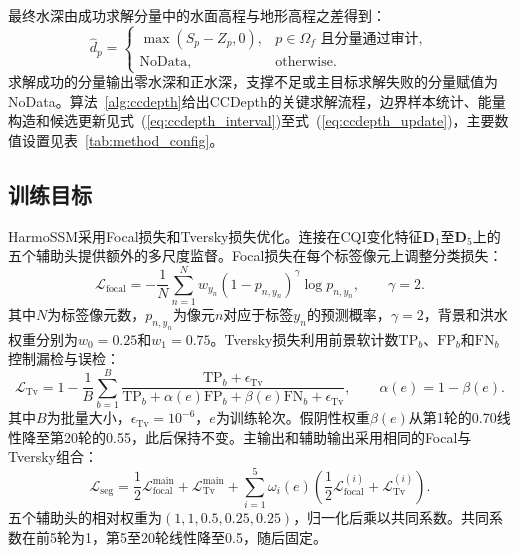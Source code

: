 \documentclass[authoryear,preprint,12pt]{elsarticle}
\begin{document}
最终水深由成功求解分量中的水面高程与地形高程之差得到：
\begin{equation}\label{eq:ccdepth_depth}
 \hat d_p=
 \begin{cases}
  \max(S_p-Z_p,0), & p\in\Omega_f\text{ 且分量通过审计},\\
  \text{NoData}, & \text{otherwise}.
 \end{cases}
\end{equation}
求解成功的分量输出零水深和正水深，支撑不足或主目标求解失败的分量赋值为NoData。算法~\ref{alg:ccdepth}给出CCDepth的关键求解流程，边界样本统计、能量构造和候选更新见式~(\ref{eq:ccdepth_interval})至式~(\ref{eq:ccdepth_update})，主要数值设置见表~\ref{tab:method_config}。



\subsection{训练目标}\label{sec:loss}\label{sec:training_objective}

HarmoSSM采用Focal损失和Tversky损失优化。连接在CQI变化特征\(\mathbf D_1\)至\(\mathbf D_5\)上的五个辅助头提供额外的多尺度监督。Focal损失\citep{lin2017focal}在每个标签像元上调整分类损失：
\begin{equation}\label{eq:focal_loss}
  \mathcal{L}_{\mathrm{focal}}
  =
  -\frac{1}{N}
  \sum_{n=1}^{N}
  w_{y_n}\left(1-p_{n,y_n}\right)^{\gamma}
  \log p_{n,y_n},
  \qquad \gamma=2.
\end{equation}
其中\(N\)为标签像元数，\(p_{n,y_n}\)为像元\(n\)对应于标签\(y_n\)的预测概率，\(\gamma=2\)，背景和洪水权重分别为\(w_0=0.25\)和\(w_1=0.75\)。Tversky损失\citep{salehi2017tversky}利用前景软计数\(\mathrm{TP}_b\)、\(\mathrm{FP}_b\)和\(\mathrm{FN}_b\)控制漏检与误检：
\begin{equation}\label{eq:tversky_loss}
 \mathcal{L}_{\mathrm{Tv}}=1-\frac{1}{B}\sum_{b=1}^{B}
 \frac{\mathrm{TP}_b+\epsilon_{\mathrm{Tv}}}{\mathrm{TP}_b+\alpha(e)\mathrm{FP}_b+\beta(e)\mathrm{FN}_b+\epsilon_{\mathrm{Tv}}},\qquad\alpha(e)=1-\beta(e).
\end{equation}
其中\(B\)为批量大小，\(\epsilon_{\mathrm{Tv}}=10^{-6}\)，\(e\)为训练轮次。假阴性权重\(\beta(e)\)从第1轮的0.70线性降至第20轮的0.55，此后保持不变。主输出和辅助输出采用相同的Focal与Tversky组合：
\begin{equation}\label{eq:segmentation_loss}
  \mathcal{L}_{\mathrm{seg}}
  =
  \frac{1}{2}\mathcal{L}_{\mathrm{focal}}^{\mathrm{main}}
  +
  \mathcal{L}_{\mathrm{Tv}}^{\mathrm{main}}
  +
  \sum_{i=1}^{5}\omega_i(e)
  \left(
  \frac{1}{2}\mathcal{L}_{\mathrm{focal}}^{(i)}
  +
  \mathcal{L}_{\mathrm{Tv}}^{(i)}
  \right).
\end{equation}
五个辅助头的相对权重为\((1,1,0.5,0.25,0.25)\)，归一化后乘以共同系数。共同系数在前5轮为1，第5至20轮线性降至0.5，随后固定。
\end{document}
